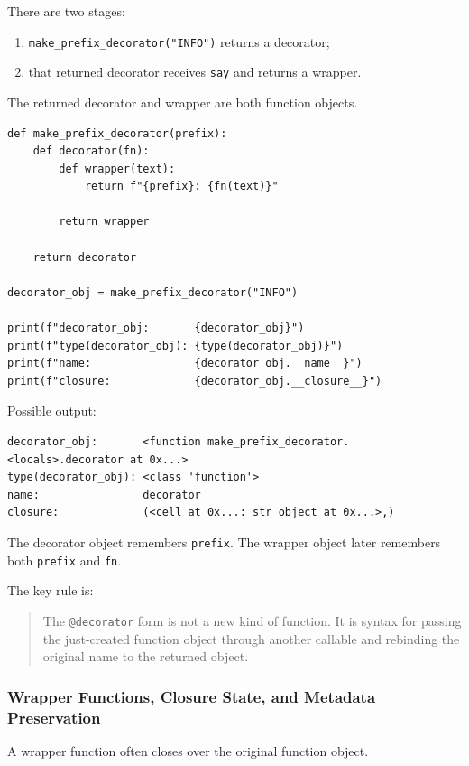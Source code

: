 There are two stages:

\begin{enumerate}
    \item \texttt{make\_prefix\_decorator("INFO")} returns a decorator;
    \item that returned decorator receives \texttt{say} and returns a wrapper.
\end{enumerate}

The returned decorator and wrapper are both function objects.

\begin{verbatim}
def make_prefix_decorator(prefix):
    def decorator(fn):
        def wrapper(text):
            return f"{prefix}: {fn(text)}"

        return wrapper

    return decorator

decorator_obj = make_prefix_decorator("INFO")

print(f"decorator_obj:       {decorator_obj}")
print(f"type(decorator_obj): {type(decorator_obj)}")
print(f"name:                {decorator_obj.__name__}")
print(f"closure:             {decorator_obj.__closure__}")
\end{verbatim}

Possible output:

\begin{verbatim}
decorator_obj:       <function make_prefix_decorator.<locals>.decorator at 0x...>
type(decorator_obj): <class 'function'>
name:                decorator
closure:             (<cell at 0x...: str object at 0x...>,)
\end{verbatim}

The decorator object remembers \texttt{prefix}. The wrapper object later remembers both \texttt{prefix} and \texttt{fn}.

The key rule is:

\begin{quote}
The \texttt{@decorator} form is not a new kind of function. It is syntax for passing the just-created function object through another callable and rebinding the original name to the returned object.
\end{quote}

\subsubsection{Wrapper Functions, Closure State, and Metadata Preservation}

A wrapper function often closes over the original function object.

